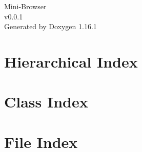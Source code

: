 \documentclass[twoside]{book}
\newcommand{\+}{\discretionary{\mbox{\scriptsize$\hookleftarrow$}}{}{}}
\newcommand{\clearemptydoublepage}{%
    \newpage{\pagestyle{empty}\cleardoublepage}%
  }
\begin{document}
  \raggedbottom
    \hypersetup{pageanchor=false,
                bookmarksnumbered=true,
                pdfencoding=unicode
               }
  \begin{titlepage}
  \vspace*{7cm}
  \begin{center}%
  {\Large Mini-\/\+Browser}\\
  [1ex]\large v0.\+0.\+1 \\
  \vspace*{1cm}
  {\large Generated by Doxygen 1.16.1}\\
  \end{center}
  \end{titlepage}
  \clearemptydoublepage
  \tableofcontents
  \clearemptydoublepage
  \hypersetup{pageanchor=true}



\chapter{Hierarchical Index}

\chapter{Class Index}

\chapter{File Index}

\end{document}
